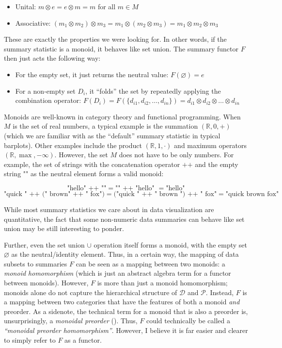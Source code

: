 \documentclass[
]{book}
\providecommand{\tightlist}{%
  \setlength{\itemsep}{0pt}\setlength{\parskip}{0pt}}
\theoremstyle{definition}
\theoremstyle{definition}
\theoremstyle{definition}
\theoremstyle{definition}
\theoremstyle{remark}
\begin{document}
\begin{itemize}
\tightlist
\item
  Unital: \(m \otimes e = e \otimes m = m\) for all \(m \in M\)
\item
  Associative: \((m_1 \otimes m_2) \otimes m_3 = m_1 \otimes (m_2 \otimes m_3) = m_1 \otimes m_2 \otimes m_3\)
\end{itemize}

These are exactly the properties we were looking for. In other words, if the summary statistic is a monoid, it behaves like set union. The summary functor \(F\) then just acts the following way:

\begin{itemize}
\tightlist
\item
  For the empty set, it just returns the neutral value: \(F(\varnothing) = e\)
\item
  For a non-empty set \(D_i\), it ``folds'' the set by repeatedly applying the combination operator: \(F(D_i) = F(\{d_{i1} , d_{i2}, \ldots, d_{in} \}) = d_{i1} \otimes d_{i2} \otimes \ldots \otimes d_{in}\)
\end{itemize}

Monoids are well-known in category theory and functional programming. When \(M\) is the set of real numbers, a typical example is the summation \((\mathbb{R}, 0, +)\) (which we are familiar with as the ``default'' summary statistic in typical barplots). Other examples include the product \((\mathbb{R}, 1, \cdot)\) and maximum operators \((\mathbb{R}, \max, -\infty)\). However, the set \(M\) does not have to be only numbers. For example, the set of strings with the concatenation operator \(\text{++}\) and the empty string \(\text{""}\) as the neutral element forms a valid monoid:

\[\text{"hello" ++ ""} = \text{"" ++ "hello" } = \text{"hello"} \]
\[\text{"quick " ++ (" brown" ++ " fox")}  \text{} = \text{("quick " ++ " brown ") ++ " fox"} = \text{"quick brown fox"}\]

While most summary statistics we care about in data visualization are quantitative, the fact that some non-numeric data summaries can behave like set union may be still interesting to ponder.

Further, even the set union \(\cup\) operation itself forms a monoid, with the empty set \(\varnothing\) as the neutral/identity element. Thus, in a certain way, the mapping of data subsets to summaries \(F\) can be seen as a mapping between two monoids: a \emph{monoid homomorphism} (which is just an abstract algebra term for a functor between monoids). However, \(F\) is more than just a monoid homomorphism; monoids alone do not capture the hierarchical structure of \(\mathcal{D}\) and \(\mathcal{P}\). Instead, \(F\) is a mapping between two categories that have the features of both a monoid \emph{and} preorder. As a sidenote, the technical term for a monoid that is also a preorder is, unsurprisingly, a \emph{monoidal preorder} (). Thus, \(F\) could technically be called a \emph{``monoidal preorder homomorphism''}. However, I believe it is far easier and clearer to simply refer to \(F\) as a functor.
\end{document}
